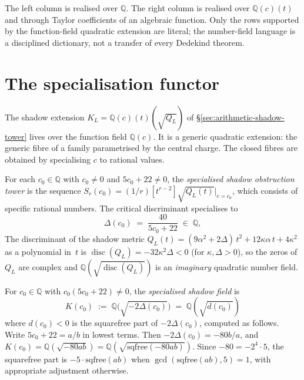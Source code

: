 \documentclass[11pt]{article}
\newcommand{\Q}{\mathbb{Q}}
\begin{document}
\medskip

The left column is realised over $\Q$.  The right column is
realised over $\Q(c)(t)$ and through Taylor coefficients of an
algebraic function.  Only the rows supported by the
function-field quadratic extension are literal; the number-field
language is a disciplined dictionary, not a transfer of every
Dedekind theorem.


\section{The specialisation functor}
\label{sec:specialisation-functor}

The shadow extension $K_L = \Q(c)(t)(\sqrt{Q_L})$ of
\S\ref{sec:arithmetic-shadow-tower} lives over the function
field $\Q(c)$.  It is a generic quadratic extension: the
generic fibre of a family parametrised by the central charge.
The closed fibres are obtained by specialising $c$ to rational
values.

For each $c_0 \in \Q$ with $c_0 \neq 0$ and
$5c_0 + 22 \neq 0$, the \emph{specialised shadow obstruction tower} is
the sequence $S_r(c_0) = (1/r)[t^{r-2}]\sqrt{Q_L(t)}|_{c=c_0}$,
which consists of specific rational numbers.  The critical
discriminant specialises to
\begin{equation}\label{eq:delta-specialised}
  \Delta(c_0) \;=\; \frac{40}{5c_0 + 22} \;\in\; \Q,
\end{equation}
The discriminant of the shadow metric
$Q_L(t) = (9\alpha^2 + 2\Delta)\,t^2 + 12\kappa\alpha\,t + 4\kappa^2$
as a polynomial in~$t$ is
$\operatorname{disc}(Q_L) = -32\kappa^2\Delta < 0$
(for $\kappa, \Delta > 0$), so the zeros of $Q_L$ are complex
and $\Q(\sqrt{\operatorname{disc}(Q_L)})$ is an
\emph{imaginary} quadratic number field.

\begin{definition}
\label{def:specialised-shadow-field}
For $c_0 \in \Q$ with $c_0(5c_0 + 22) \neq 0$, the
\emph{specialised shadow field} is
\begin{equation}\label{eq:specialised-field}
  K(c_0) \;:=\; \Q\bigl(\sqrt{-2\Delta(c_0)}\bigr)
  \;=\; \Q\!\left(\sqrt{d(c_0)}\right)
\end{equation}
where $d(c_0) < 0$ is the squarefree part of $-2\Delta(c_0)$,
computed as follows.  Write $5c_0 + 22 = a/b$ in lowest terms.
Then $-2\Delta(c_0) = -80b/a$, and
$K(c_0) = \Q(\sqrt{-80ab}) = \Q(\sqrt{\mathrm{sqfree}(-80ab)})$.
Since $-80 = -2^4 \cdot 5$, the squarefree part is
$-5\cdot\mathrm{sqfree}(ab)$ when $\gcd(\mathrm{sqfree}(ab), 5) = 1$,
with appropriate adjustment otherwise.
\end{definition}
\end{document}
